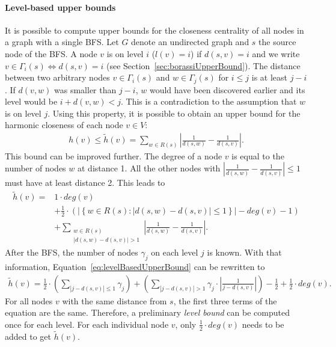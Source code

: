 \paragraph{Level-based upper bounds}
It is possible to compute upper bounds for the closeness centrality of all nodes in a graph with a single BFS. Let $G$ denote an undirected graph and $s$ the source node of the BFS. A node $v$ is on level $i$ ($l(v) = i$) if $d(s, v) = i$ and we write $v \in \Gamma_i(s) \iff d(s, v) = i$ (see Section~\ref{sec:borassiUpperBound}). The distance between two arbitrary nodes $v \in \Gamma_i(s)$ and $w \in \Gamma_j(s)$ for $i \leq j$ is at least $j - i$. If $d(v, w)$ was smaller than $j - i$, $w$ would have been discovered earlier and its level would be $i + d(v, w) < j$. This is a contradiction to the assumption that $w$ is on level $j$. Using this property, it is possible to obtain an upper bound for the harmonic closeness of each node $v \in V$:
\begin{align*}
	h(v) \leq \widetilde{h}(v) = \sum_{w \in R(s)}{\left| \frac{1}{d(s, w)} - \frac{1}{d(s, v)} \right| }.
\end{align*}
This bound can be improved further. The degree of a node $v$ is equal to the number of nodes $w$ at distance 1. All the other nodes with $\left| \frac{1}{d(s, w)} - \frac{1}{d(s, v)}\right| \leq 1$ must have at least distance 2. This leads to
\begin{align}
	\widetilde{h}(v) ={} &1\cdot deg(v) \nonumber \\
	               &+ \frac{1}{2} \cdot \left( \left|\left\{ w \in R(s) : \left| d(s, w) - d(s, v) \right| \leq 1 \right\} \right| - deg(v) - 1 \right) \nonumber \\
	               &+ \sum_{\substack{w \in R(s) \\ |d(s, w) - d(s, v)| > 1}}{|\frac{1}{d(s, w)} - \frac{1}{d(s, v)}|}. \label{eq:levelBasedUpperBound} 
\end{align}
After the BFS, the number of nodes $\gamma_j$ on each level $j$ is known. With that information, Equation~\ref{eq:levelBasedUpperBound} can be rewritten to
\begin{align}
	\widetilde{h}(v) = \frac{1}{2} \cdot \left(\sum_{|j - d(s, v)| \leq 1}{\gamma_j}\right) + \left(\sum_{|j - d(s, v)| > 1}{\gamma_j \cdot \left|\frac{1}{j - d(s, v)}\right|}\right) - \frac{1}{2} + \frac{1}{2} \cdot deg(v).
\end{align}
For all nodes $v$ with the same distance from $s$, the first three terms of the equation are the same. Therefore, a preliminary \emph{level bound} can be computed once for each level. For each individual node $v$, only $\frac{1}{2}\cdot deg(v)$ needs to be added to get $\widetilde{h}(v)$.

